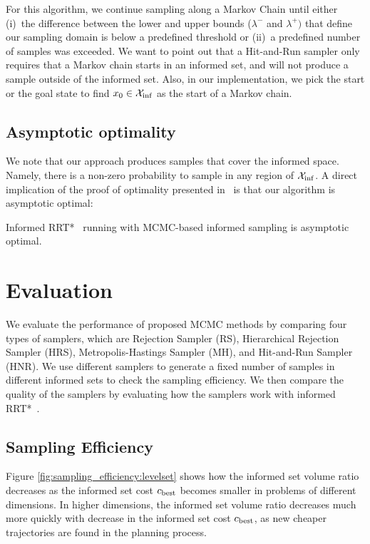 \documentclass[letterpaper, 10 pt, conference]{ieeeconf}  %
\begin{document}
For this algorithm, we continue sampling along a Markov Chain until either 
(i)~the difference between the lower and upper bounds ($\lambda^-$ and $\lambda^+)$ 
that define our sampling domain is below a predefined threshold or
(ii)~a predefined number of samples was exceeded.
We want to point out that a Hit-and-Run sampler only requires that a Markov chain starts in an informed set, and will not produce a sample outside of the informed set.
Also, in our implementation, we pick the start or the goal state to find $ x_0 \in \mathcal{X}_{\rm {inf}} $ as the start of a Markov chain.



\subsection{Asymptotic optimality}
We note that our approach produces samples that cover the informed space. 
Namely, there is a non-zero probability to sample in any region of $\mathcal{X}_{\rm {inf}}$.
A direct implication of the proof of optimality presented in~\cite{KF11} is that our algorithm is asymptotic optimal:

\begin{prop}
	\label{prop:asym_opt}
	Informed RRT*~\cite{GSB14} running with MCMC-based informed sampling is asymptotic optimal.	
\end{prop}

\section{Evaluation}
\label{sec:eval}

We evaluate the performance of proposed MCMC methods by comparing four types of samplers, which are Rejection Sampler (RS), Hierarchical Rejection Sampler (HRS), Metropolis-Hastings Sampler (MH), and Hit-and-Run Sampler (HNR).
We use different samplers to generate a fixed number of samples in different informed sets to check the sampling efficiency. %
We then compare the quality of the samplers by evaluating how the samplers work with informed RRT*~\cite{GSB14}.

\subsection{Sampling Efficiency}

Figure \ref{fig:sampling_efficiency:levelset} shows how the informed set volume ratio decreases as the informed set cost $ c_{\rm best} $ becomes smaller in problems of different dimensions.
In higher dimensions, the informed set volume ratio decreases much more quickly with decrease in the informed set cost $ c_{\rm best} $, as new cheaper trajectories are found in the planning process.
\end{document}
